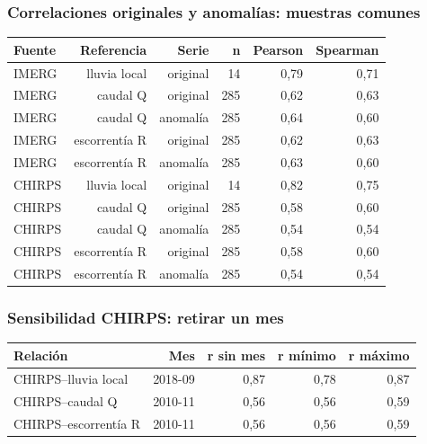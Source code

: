 \documentclass[10pt,a4paper]{article}
\begin{document}
\subsubsection*{Correlaciones originales y anomalías: muestras comunes}
\begin{center}\small\begin{tabular}{lrrrrr}\hline
Fuente & Referencia & Serie & n & Pearson & Spearman \\ \hline
IMERG & lluvia local & original & 14 & 0,79 & 0,71 \\
IMERG & caudal Q & original & 285 & 0,62 & 0,63 \\
IMERG & caudal Q & anomalía & 285 & 0,64 & 0,60 \\
IMERG & escorrentía R & original & 285 & 0,62 & 0,63 \\
IMERG & escorrentía R & anomalía & 285 & 0,63 & 0,60 \\
CHIRPS & lluvia local & original & 14 & 0,82 & 0,75 \\
CHIRPS & caudal Q & original & 285 & 0,58 & 0,60 \\
CHIRPS & caudal Q & anomalía & 285 & 0,54 & 0,54 \\
CHIRPS & escorrentía R & original & 285 & 0,58 & 0,60 \\
CHIRPS & escorrentía R & anomalía & 285 & 0,54 & 0,54 \\
\hline\end{tabular}\end{center}
\subsubsection*{Sensibilidad CHIRPS: retirar un mes}
\begin{center}\small\begin{tabular}{lrrrr}\hline
Relación & Mes & r sin mes & r mínimo & r máximo \\ \hline
CHIRPS--lluvia local & 2018-09 & 0,87 & 0,78 & 0,87 \\
CHIRPS--caudal Q & 2010-11 & 0,56 & 0,56 & 0,59 \\
CHIRPS--escorrentía R & 2010-11 & 0,56 & 0,56 & 0,59 \\
\hline\end{tabular}\end{center}
\end{document}
